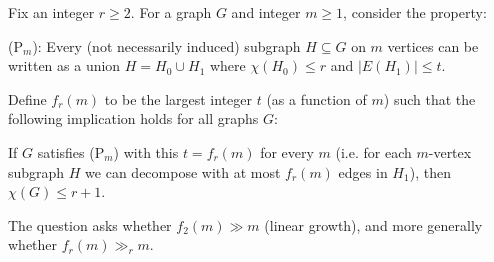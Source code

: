 Fix an integer $r\ge 2$.
For a graph $G$ and integer $m\ge 1$, consider the property:

(P$_m$): Every (not necessarily induced) subgraph $H\subseteq G$ on $m$ vertices can be written as a union $H=H_0\cup H_1$ where $\chi(H_0)\le r$ and $|E(H_1)|\le t$.

Define $f_r(m)$ to be the largest integer $t$ (as a function of $m$) such that the following implication holds for all graphs $G$:

If $G$ satisfies (P$_m$) with this $t=f_r(m)$ for every $m$ (i.e. for each $m$-vertex subgraph $H$ we can decompose with at most $f_r(m)$ edges in $H_1$), then $\chi(G)\le r+1$.

The question asks whether $f_2(m)\gg m$ (linear growth), and more generally whether $f_r(m)\gg_r m$.
